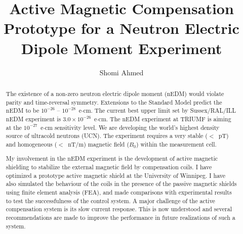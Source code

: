
\title{Active Magnetic Compensation Prototype for a Neutron Electric Dipole Moment Experiment}
\author{Shomi Ahmed}

%
%
%





\maketitle

\begin{abstract}
The existence of a non-zero neutron electric dipole moment (nEDM) would violate parity and time-reversal symmetry.  Extensions to the Standard Model predict the nEDM to be $10^{-26}$ -- $10^{-28}$~e$\cdot$cm.  The current best upper limit set by Sussex/RAL/ILL nEDM experiment is $3.0 \times 10^{-26}$~e$\cdot$cm\cite{bestLim_1,bestLim_2}.  The nEDM experiment at TRIUMF is aiming at the $10^{-27}$~e$\cdot$cm sensitivity level.  We are developing the world's highest density source of ultracold neutrons (UCN).  The experiment requires a very stable ($<$~pT) and homogeneous ($<$~nT/m) magnetic field ($B_0$) within the measurement cell.  

My involvement in the nEDM experiment is the development of active magnetic shielding to stabilize the external magnetic field by compensation coils. I have optimized a prototype active magnetic shield at the University of Winnipeg. I have also simulated the behaviour of the coils in the presence of the passive magnetic shields  using finite element analysis (FEA), and made comparisons with  experimental results  to test the successfulness of the control system. A major challenge of the active 
compensation system is its  slow current response.  This is now understood and several recommendations are made to improve the performance in future realizations of such a system.





\end{abstract}


